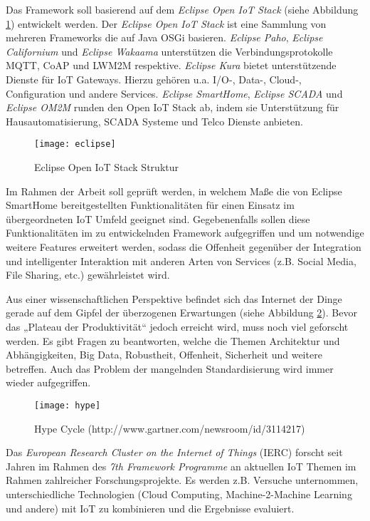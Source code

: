 \documentclass[12pt]{article}
\begin{document}
Das Framework soll basierend auf dem \textit{Eclipse Open IoT Stack} (siehe Abbildung \ref{fig:eclipse}) entwickelt werden. Der \textit{Eclipse Open IoT Stack} ist eine Sammlung von mehreren Frameworks die auf Java OSGi basieren. \textit{Eclipse Paho}, \textit{Eclipse Californium} und \textit{Eclipse Wakaama} unterstützen die Verbindungsprotokolle MQTT, CoAP und LWM2M respektive. \textit{Eclipse Kura} bietet unterstützende Dienste für IoT Gateways. Hierzu gehören u.a. I/O-, Data-, Cloud-, Configuration und andere Services. \textit{Eclipse SmartHome}, \textit{Eclipse SCADA} und \textit{Eclipse OM2M} runden den Open IoT Stack ab, indem sie Unterstützung für Hausautomatisierung, SCADA Systeme und Telco Dienste anbieten.

\begin{figure}[h]
    \centering
    \texttt{[image: eclipse]}
    \caption{Eclipse Open IoT Stack Struktur}
    \label{fig:eclipse}
\end{figure}

Im Rahmen der Arbeit soll geprüft werden, in welchem Maße die von Eclipse SmartHome bereitgestellten Funktionalitäten für einen Einsatz im übergeordneten IoT Umfeld geeignet sind. Gegebenenfalls sollen diese Funktionalitäten im zu entwickelnden Framework aufgegriffen und um notwendige weitere Features erweitert werden, sodass die Offenheit gegenüber der Integration und intelligenter Interaktion mit anderen Arten von Services (z.B. Social Media, File Sharing, etc.) gewährleistet wird. 

Aus einer wissenschaftlichen Perspektive befindet sich das Internet der Dinge gerade auf dem Gipfel der überzogenen Erwartungen (siehe Abbildung \ref{fig:hype}). Bevor das „Plateau der Produktivität“ jedoch erreicht wird, muss noch viel geforscht werden. Es gibt Fragen zu beantworten, welche die Themen Architektur und Abhängigkeiten, Big Data, Robustheit, Offenheit, Sicherheit und weitere betreffen. Auch das Problem der mangelnden Standardisierung wird immer wieder aufgegriffen.

\begin{figure}
    \centering
    \texttt{[image: hype]}
    \caption{Hype Cycle (http://www.gartner.com/newsroom/id/3114217)}
    \label{fig:hype}
\end{figure}

Das \textit{European Research Cluster on the Internet of Things} (IERC) forscht seit Jahren im Rahmen des \textit{7th Framework Programme} an aktuellen IoT Themen im Rahmen zahlreicher Forschungsprojekte. Es werden z.B. Versuche unternommen, unterschiedliche Technologien (Cloud Computing, Machine-2-Machine Learning und andere) mit IoT zu kombinieren und die Ergebnisse evaluiert.
\end{document}
